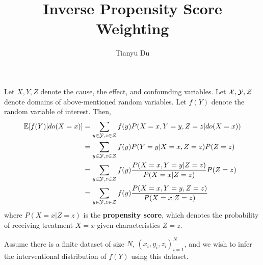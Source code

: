 \documentclass[11pt]{article}
\title{Inverse Propensity Score Weighting}
\author{Tianyu Du}
\begin{document}
\maketitle
\paragraph{} Let $X, Y, Z$ denote the cause, the effect, and confounding variables. Let $\mathcal{{X}}, \mathcal{{Y}}, \mathcal{{Z}}$ denote domains of above-mentioned random variables. Let $f(Y)$ denote the random variable of interest. Then,
\begin{align}
	\mathbb{E}[f(Y)|do(X=x)] &= \sum_{y \in \mathcal{{Y}}, z \in \mathcal{{Z}}} f(y) P(X=x,Y=y,Z=z|do(X=x)) \\
	&= \sum_{y \in \mathcal{{Y}}, z \in \mathcal{{Z}}} f(y) P(Y=y|X=x, Z=z) P(Z=z) \\
	&= \sum_{y \in \mathcal{{Y}}, z \in \mathcal{{Z}}} f(y) \frac{P(X=x, Y=y | Z=z)}{P(X=x|Z=z)} P(Z=z) \\
	&=\sum_{y \in \mathcal{{Y}}, z \in \mathcal{{Z}}} f(y) \frac{P(X=x, Y=y, Z=z)}{P(X=x|Z=z)}
\end{align}
	where $P(X=x|Z=z)$ is the \textbf{propensity score}, which denotes the probability of receiving treatment $X=x$ given characteristics $Z=z$.
	
	Assume there is a finite dataset of size $N$, $(x_i, y_i, z_i)_{i=1}^N$, and we wish to infer the interventional distribution of $f(Y)$ using this dataset.
\end{document}

